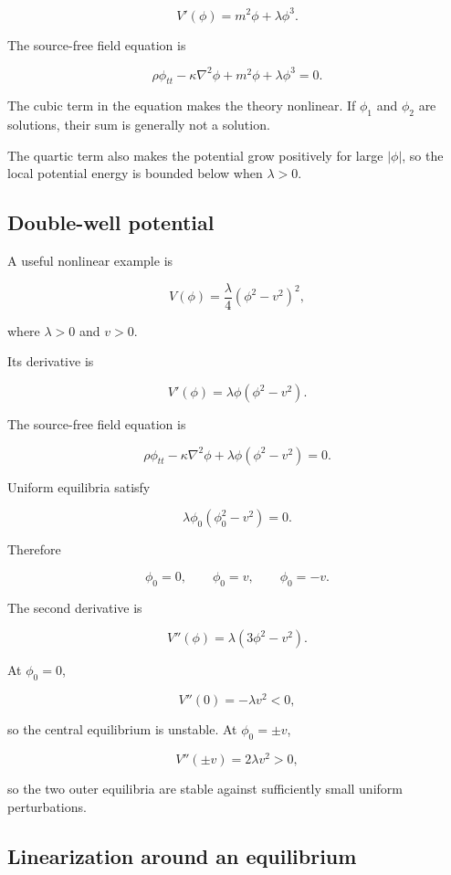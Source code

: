 \[
V'(\phi)
=
m^{2}\phi
+
\lambda\phi^{3}.
\]

The source-free field equation is

\[
\boxed{
\rho\phi_{tt}
-
\kappa\nabla^{2}\phi
+
m^{2}\phi
+
\lambda\phi^{3}
=0
}.
\]

The cubic term in the equation makes the theory nonlinear. If \(\phi_{1}\) and \(\phi_{2}\) are solutions, their sum is generally not a solution.

The quartic term also makes the potential grow positively for large \(|\phi|\), so the local potential energy is bounded below when \(\lambda>0\).

\subsection{Double-well potential}

A useful nonlinear example is

\[
\boxed{
V(\phi)
=
\frac{\lambda}{4}
(\phi^{2}-v^{2})^{2}
},
\]

where \(\lambda>0\) and \(v>0\).

Its derivative is

\[
V'(\phi)
=
\lambda\phi(\phi^{2}-v^{2}).
\]

The source-free field equation is

\[
\boxed{
\rho\phi_{tt}
-
\kappa\nabla^{2}\phi
+
\lambda\phi(\phi^{2}-v^{2})
=0
}.
\]

Uniform equilibria satisfy

\[
\lambda\phi_{0}(\phi_{0}^{2}-v^{2})=0.
\]

Therefore

\[
\phi_{0}=0,
\qquad
\phi_{0}=v,
\qquad
\phi_{0}=-v.
\]

The second derivative is

\[
V''(\phi)
=
\lambda(3\phi^{2}-v^{2}).
\]

At \(\phi_{0}=0\),

\[
V''(0)=-\lambda v^{2}<0,
\]

so the central equilibrium is unstable. At \(\phi_{0}=\pm v\),

\[
V''(\pm v)=2\lambda v^{2}>0,
\]

so the two outer equilibria are stable against sufficiently small uniform perturbations.

\subsection{Linearization around an equilibrium}

